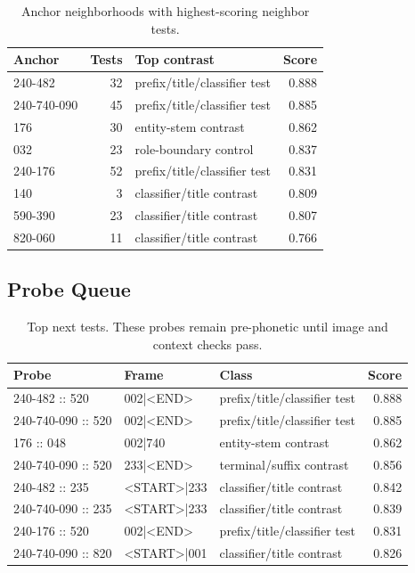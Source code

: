\begin{table}[htbp]
\centering
\footnotesize
\begin{tabular}{lrp{}r}
\toprule
\textbf{Anchor} & \textbf{Tests} & \textbf{Top contrast} & \textbf{Score} \\
\midrule
240-482 & 32 & prefix/title/classifier test & 0.888 \\
240-740-090 & 45 & prefix/title/classifier test & 0.885 \\
176 & 30 & entity-stem contrast & 0.862 \\
032 & 23 & role-boundary control & 0.837 \\
240-176 & 52 & prefix/title/classifier test & 0.831 \\
140 & 3 & classifier/title contrast & 0.809 \\
590-390 & 23 & classifier/title contrast & 0.807 \\
820-060 & 11 & classifier/title contrast & 0.766 \\
\bottomrule
\end{tabular}
\caption{Anchor neighborhoods with highest-scoring neighbor tests.}
\end{table}

\subsection{Probe Queue}

\begin{table}[htbp]
\centering
\footnotesize
\begin{tabular}{p{}lp{}r}
\toprule
\textbf{Probe} & \textbf{Frame} & \textbf{Class} & \textbf{Score} \\
\midrule
240-482 :: 520 & 002|<END> & prefix/title/classifier test & 0.888 \\
240-740-090 :: 520 & 002|<END> & prefix/title/classifier test & 0.885 \\
176 :: 048 & 002|740 & entity-stem contrast & 0.862 \\
240-740-090 :: 520 & 233|<END> & terminal/suffix contrast & 0.856 \\
240-482 :: 235 & <START>|233 & classifier/title contrast & 0.842 \\
240-740-090 :: 235 & <START>|233 & classifier/title contrast & 0.839 \\
240-176 :: 520 & 002|<END> & prefix/title/classifier test & 0.831 \\
240-740-090 :: 820 & <START>|001 & classifier/title contrast & 0.826 \\
\bottomrule
\end{tabular}
\caption{Top next tests. These probes remain pre-phonetic until image and context checks pass.}
\end{table}

